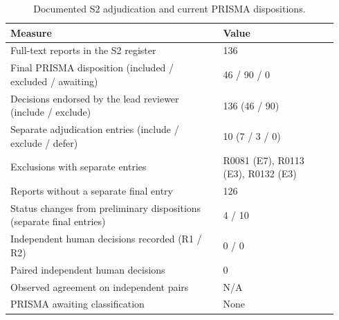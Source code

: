 \begin{table}[htbp]
\centering
\caption{Documented S2 adjudication and current PRISMA dispositions.}
\label{tab:adjudication_audit}
\begin{tabular}{@{}p{0.61\linewidth}p{0.33\linewidth}@{}}
\hline
\textbf{Measure} & \textbf{Value} \\
\hline
Full-text reports in the S2 register & 136 \\
Final PRISMA disposition (included / excluded / awaiting) & 46 / 90 / 0 \\
Decisions endorsed by the lead reviewer (include / exclude) & 136 (46 / 90) \\
Separate adjudication entries (include / exclude / defer) & 10 (7 / 3 / 0) \\
Exclusions with separate entries & R0081 (E7), R0113 (E3), R0132 (E3) \\
Reports without a separate final entry & 126 \\
Status changes from preliminary dispositions (separate final entries) & 4 / 10 \\
Independent human decisions recorded (R1 / R2) & 0 / 0 \\
Paired independent human decisions & 0 \\
Observed agreement on independent pairs & N/A \\
PRISMA awaiting classification & None \\
\hline
\end{tabular}
\end{table}
